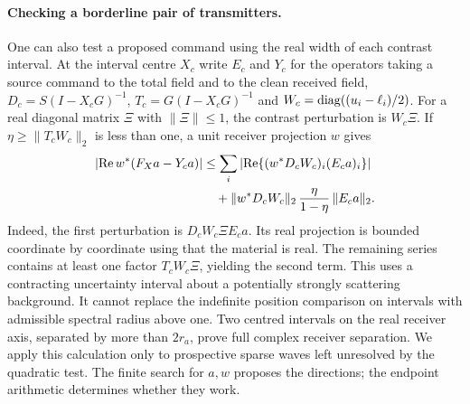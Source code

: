 \paragraph{Checking a borderline pair of transmitters.}
One can also test a proposed command using the real width of each contrast interval. At the interval centre $X_c$ write $E_c$ and $Y_c$ for the operators taking a source command to the total field and to the clean received field, $D_c=S(I-X_cG)^{-1}$, $T_c=G(I-X_cG)^{-1}$ and $W_c=\operatorname{diag}((u_i-\ell_i)/2)$. For a real diagonal matrix $\Xi$ with $\|\Xi\|\leq1$, the contrast perturbation is $W_c\Xi$. If $\eta\geq\|T_c W_c\|_2$ is less than one, a unit receiver projection $w$ gives
\begin{align}
 \left|{\rm Re}\, w^{\ast} (F_X a-Y_c a)\right|
 &\leq \sum_i\left|{\rm Re}\{(w^{\ast} D_cW_c)_i(E_c a)_i\}\right|\notag\\
 &\quad+\|w^{\ast} D_c W_c\|_2\,\frac{\eta}{1-\eta}\,\|E_c a\|_2 .
 \label{eq:realwidth}
\end{align}
Indeed, the first perturbation is $D_cW_c\Xi E_ca$. Its real projection is bounded coordinate by coordinate using that the material is real. The remaining series contains at least one factor $T_c W_c\Xi$, yielding the second term. This uses a contracting uncertainty interval about a potentially strongly scattering background. It cannot replace the indefinite position comparison on intervals with admissible spectral radius above one. Two centred intervals on the real receiver axis, separated by more than $2r_a$, prove full complex receiver separation. We apply this calculation only to prospective sparse waves left unresolved by the quadratic test. The finite search for $a,w$ proposes the directions; the endpoint arithmetic determines whether they work.
